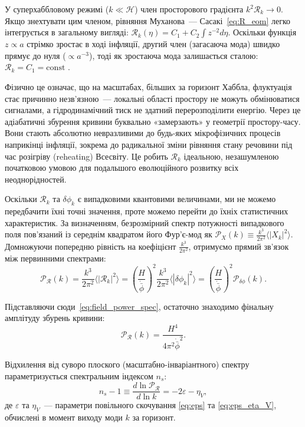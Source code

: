 У суперхаббловому режимі ($k \ll \mathcal{H}$) член просторового градієнта $k^2\mathcal{R}_k \to 0$. Якщо знехтувати цим членом, рівняння Муханова~--- Сасакі~\eqref{eq:R_eom} легко інтегрується в загальному вигляді: $\mathcal{R}_k(\eta) = C_1 + C_2 \int z^{-2} d\eta$. Оскільки функція $z \propto a$ стрімко зростає в ході інфляції, другий член (загасаюча мода) швидко прямує до нуля ($\propto a^{-3}$), тоді як зростаюча мода залишається сталою: $\mathcal{R}_k = C_1 = \mathrm{const}$ \cite{bardeen_1980}.

Фізично це означає, що на масштабах, більших за горизонт Хаббла, флуктуація стає причинно незв'язною~--- локальні області простору не можуть обмінюватися сигналами, а гідродинамічний тиск не здатний перерозподілити енергію. Через це адіабатичні збурення кривини буквально «замерзають» у геометрії простору-часу. Вони стають абсолютно невразливими до будь-яких мікрофізичних процесів наприкінці інфляції, зокрема до радикальної зміни рівняння стану речовини під час розігріву (reheating) Всесвіту. Це робить $\mathcal{R}_k$ ідеальною, незашумленою початковою умовою для подальшого еволюційного розвитку всіх неоднорідностей.

Оскільки $\mathcal{R}_k$ та $\delta\phi_k$ є випадковими квантовими величинами, ми не можемо передбачити їхні точні значення, проте можемо перейти до їхніх статистичних характеристик.
За визначенням, безрозмірний спектр потужності випадкового поля пов'я\-заний із середнім квадратом його Фур'є-мод як $\mathcal{P}_X(k) \equiv \frac{k^3}{2\pi^2} \langle |X_k|^2 \rangle$. Домножуючи попередню рівність на коефіцієнт $\frac{k^3}{2\pi^2}$, отримуємо прямий зв'язок між первинними спектрами:
\begin{equation}\label{eq:spec_relation}
  \mathcal{P}_{\mathcal{R}}(k) = \frac{k^3}{2\pi^2} \langle |\mathcal{R}_k|^2 \rangle = \left(\frac{H}{\dot{\bar{\phi}}}\right)^{\!2} \frac{k^3}{2\pi^2} \langle |\delta\phi_k|^2 \rangle = \left(\frac{H}{\dot{\bar{\phi}}}\right)^{\!2} \mathcal{P}_{\delta\phi}(k).
\end{equation}

Підставляючи сюди~\eqref{eq:field_power_spec}, остаточно знаходимо фінальну амплітуду збурень кривини:
\begin{equation}\label{eq:curvature_power_spec}
  \mathcal{P}_{\mathcal{R}}(k) = \frac{H^4}{4\pi^2\dot{\bar{\phi}}^2}.
\end{equation}

Відхилення від суворо плоского (масштабно-інваріантного) спектру параметризується спектральним індексом $n_s$:
\begin{equation}\label{eq:ns}
  n_s - 1 \equiv \frac{d\ln\mathcal{P}_{\mathcal{R}}}{d\ln k} = -2\varepsilon - \eta_V,
\end{equation}
де $\varepsilon$ та $\eta_V$~--- параметри повільного скочування \eqref{eq:eps} та \eqref{eq:eps_eta_V}, обчислені в момент виходу моди $k$ за горизонт.

